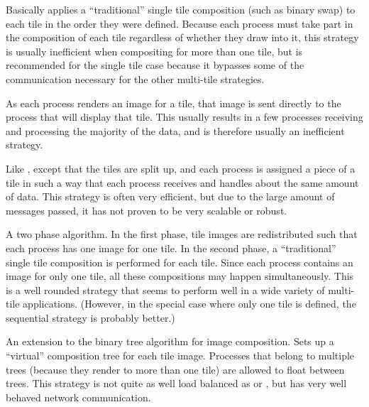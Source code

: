 
  \begin{Description}
  \item[\CEnum{ICET\_STRATEGY\_SEQUENTIAL}]
    Basically applies a ``traditional'' single tile composition (such as
    binary swap) to each tile in the order they were defined.  Because each
    process must take part in the composition of each tile regardless of
    whether they draw into it, this strategy is usually inefficient when
    compositing for more than one tile, but is recommended for the single
    tile case because it bypasses some of the communication necessary for
    the other multi-tile strategies.
  \item[\CEnum{ICET\_STRATEGY\_DIRECT}] As each process renders an image
    for a tile, that image is sent directly to the process that will
    display that tile.  This usually results in a few processes receiving
    and processing the majority of the data, and is therefore usually an
    inefficient strategy.
  \item[\CEnum{ICET\_STRATEGY\_SPLIT}] Like ,
    except that the tiles are split up, and each process is assigned a
    piece of a tile in such a way that each process receives and handles
    about the same amount of data.  This strategy is often very efficient,
    but due to the large amount of messages passed, it has not proven to be
    very scalable or robust.
  \item[\CEnum{ICET\_STRATEGY\_REDUCE}] A two phase algorithm.  In the
    first phase, tile images are redistributed such that each process has
    one image for one tile.  In the second phase, a ``traditional'' single
    tile composition is performed for each tile.  Since each process
    contains an image for only one tile, all these compositions may happen
    simultaneously.  This is a well rounded strategy that seems to perform
    well in a wide variety of multi-tile applications.  (However, in the
    special case where only one tile is defined, the sequential strategy is
    probably better.)
  \item[\CEnum{ICET\_STRATEGY\_VTREE}] An extension to the binary tree
    algorithm for image composition.  Sets up a ``virtual'' composition
    tree for each tile image.  Processes that belong to multiple trees
    (because they render to more than one tile) are allowed to float
    between trees.  This strategy is not quite as well load balanced as
     or , but
    has very well behaved network communication.
  \end{Description}
